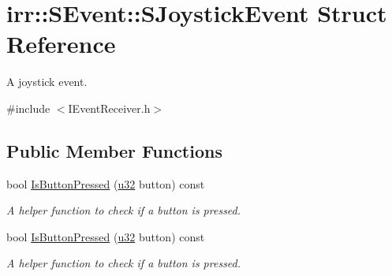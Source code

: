 \hypertarget{structirr_1_1SEvent_1_1SJoystickEvent}{}\section{irr\+:\+:S\+Event\+:\+:S\+Joystick\+Event Struct Reference}
\label{structirr_1_1SEvent_1_1SJoystickEvent}


A joystick event.  




{\ttfamily \#include $<$I\+Event\+Receiver.\+h$>$}

\subsection*{Public Member Functions}
\begin{DoxyCompactItemize}
\item 
\mbox{\label{structirr_1_1SEvent_1_1SJoystickEvent_a618eae5c6218fc9d3b93e68038ca97f2}} 
bool \hyperlink{structirr_1_1SEvent_1_1SJoystickEvent_a618eae5c6218fc9d3b93e68038ca97f2}{Is\+Button\+Pressed} (\hyperlink{namespaceirr_a0416a53257075833e7002efd0a18e804}{u32} button) const
\begin{DoxyCompactList}\small\item\em A helper function to check if a button is pressed. \end{DoxyCompactList}\item 
\mbox{\label{structirr_1_1SEvent_1_1SJoystickEvent_a618eae5c6218fc9d3b93e68038ca97f2}} 
bool \hyperlink{structirr_1_1SEvent_1_1SJoystickEvent_a618eae5c6218fc9d3b93e68038ca97f2}{Is\+Button\+Pressed} (\hyperlink{namespaceirr_a0416a53257075833e7002efd0a18e804}{u32} button) const
\begin{DoxyCompactList}\small\item\em A helper function to check if a button is pressed. \end{DoxyCompactList}\end{DoxyCompactItemize}
